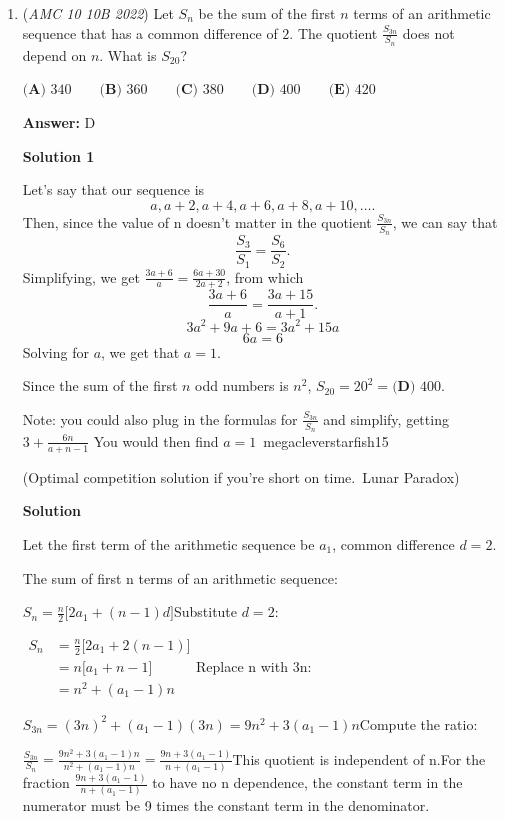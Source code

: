 \begin{enumerate}
 


	\item (\textit{AMC 10 10B 2022}) Let $S_n$ be the sum of the first $n$ terms of an arithmetic sequence that has a common difference of $2$. The quotient $\frac{S_{3n}}{S_n}$ does not depend on $n$. What is $S_{20}$?


 $\textbf{(A) } 340 \qquad \textbf{(B) } 360 \qquad \textbf{(C) } 380 \qquad \textbf{(D) } 400 \qquad \textbf{(E) } 420$

 \textbf{Answer: }D



\textbf{Solution 1}

Let's say that our sequence is 
 \[a, a+2, a+4, a+6, a+8, a+10, \ldots.\]Then, since the value of n doesn't matter in the quotient $\frac{S_{3n}}{S_n}$, we can say that
 \[\frac{S_{3}}{S_1} = \frac{S_{6}}{S_2}.\]Simplifying, we get $\frac{3a+6}{a}=\frac{6a+30}{2a+2}$, from which 
 \[\frac{3a+6}{a}=\frac{3a+15}{a+1}.\] 
 \[3a^2+9a+6=3a^2+15a\] 
 \[6a=6\] Solving for $a$, we get that $a=1$. 

 Since the sum of the first $n$ odd numbers is $n^2$, $S_{20} = 20^2 = \boxed{\textbf{(D) } 400}$.

 Note: you could also plug in the formulas for $\frac{S_{3n}}{S_{n}}$ and simplify, getting $3+ \frac{6n}{a+n-1}$ You would then find $a = 1$~megacleverstarfish15

 
(Optimal competition solution if you're short on time.~Lunar Paradox)

 



\textbf{Solution}

Let the first term of the arithmetic sequence be \(a_1\), common difference \(d=2\).

 The sum of first n terms of an arithmetic sequence:

 \(S_n=\frac{n}{2}\big[2a_1+(n-1)d\big]\)Substitute \(d=2\):

 \(\begin{align*}S_n&=\frac{n}{2}\big[2a_1+2(n-1)\big] \\&=n\big[a_1+n-1\big] \\&=n^2+(a_1-1)n\end{align*}
\)Replace n with 3n:

 \(S_{3n}=(3n)^2+(a_1-1)(3n)=9n^2+3(a_1-1)n\)Compute the ratio:

 \(\frac{S_{3n}}{S_n}=\frac{9n^2+3(a_1-1)n}{n^2+(a_1-1)n}=\frac{9n+3(a_1-1)}{n+(a_1-1)}\)This quotient is independent of n.For the fraction \(\frac{9n+3(a_1-1)}{n+(a_1-1)}\) to have no n dependence, the constant term in the numerator must be 9 times the constant term in the denominator.


\end{enumerate}
